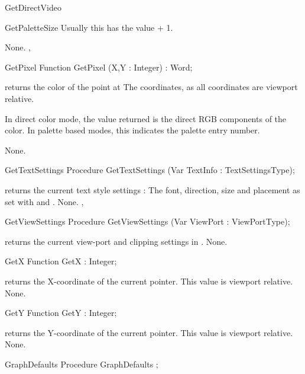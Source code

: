 \begin{function}{GetDirectVideo}
\begin{function}{GetPaletteSize}
Usually this has the value  + 1.

\Errors
None.
\SeeAlso
{},
\end{function}
\begin{function}{GetPixel}
\Declaration
Function GetPixel (X,Y : Integer) : Word;

\Description
{} returns the color
of the point at  The coordinates, as all coordinates
are viewport relative.

In direct color mode, the value returned is the direct RGB components of
the color. In palette based modes, this indicates the palette entry number.

\Errors
None.
\SeeAlso

\end{function}
\begin{procedure}{GetTextSettings}
\Declaration
Procedure GetTextSettings (Var TextInfo : TextSettingsType);

\Description
{} returns the current text style settings : The font,
direction, size and placement as set with  and
.
\Errors
None.
\SeeAlso
{}, 

\end{procedure}
\begin{procedure}{GetViewSettings}
\Declaration
Procedure GetViewSettings (Var ViewPort : ViewPortType);

\Description
{} returns the current view-port and clipping settings in
.
\Errors
None.
\SeeAlso
{}
\end{procedure}

\begin{function}{GetX}
\Declaration
Function GetX  : Integer;

\Description
{} returns the X-coordinate of the current pointer. This value is
viewport relative.
\Errors
None.
\SeeAlso
{}
\end{function}
\begin{function}{GetY}
\Declaration
Function GetY  : Integer;

\Description
{} returns the Y-coordinate of the current pointer. This value is
viewport relative.
\Errors
None.
\SeeAlso
{}
\end{function}
\begin{procedure}{GraphDefaults}
\Declaration
Procedure GraphDefaults ;


\end{procedure}
\end{function}
